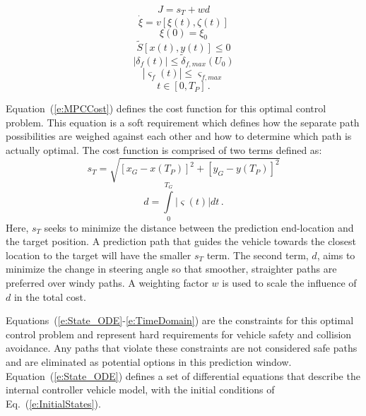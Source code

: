 \documentclass[12pt,twocolumn]{article}
\begin{document}
\begin{equation}\label{e:MPCCost}
J = s_T + wd 
\end{equation}
\begin{equation}\label{e:State_ODE}
\dot{\xi} = v\left[\xi\left(t\right),\zeta\left(t\right)\right] 
\end{equation}
\begin{equation}\label{e:InitialStates}
\xi\left(0\right) = \xi_0 
\end{equation}
\begin{equation}\label{e:SafeArea}
\tilde{S}\left[x\left(t\right),y\left(t\right)\right] \leq0  
\end{equation}
\begin{equation}\label{e:SteerLimit}
\left|\delta_f\left(t\right)\right| \leq\tilde{\delta}_{f,max}\left(U_0\right) 
\end{equation}
\begin{equation}\label{e:SteerRateLimit}
\left|\varsigma_f\left(t\right)\right| \leq\varsigma_{f,max} 
\end{equation}
\begin{equation}\label{e:TimeDomain}
t \in \left[0,T_P\right] \,.
\end{equation}

Equation~(\ref{e:MPCCost}) defines the cost function for this optimal control problem. This equation is a soft requirement which defines how the separate path possibilities are weighed against each other and how to determine which path is actually optimal. The cost function is comprised of two terms defined as:
%
\begin{equation}\label{e:DistanceCost}
s_T = \sqrt{\left[ x_G - x\left(T_P\right)\right]^2 + \left[y_G - y\left(T_P\right)\right]^2 }
\end{equation}
\begin{equation}\label{e:TurningCost}
d = \int \limits_0^{T_G} \left|\varsigma\left(t\right)\right| dt \,.
\end{equation}
%
Here, $s_{T}$ seeks to minimize the distance between the prediction end-location and the target position. A prediction path that guides the vehicle towards the closest location to the target will have the smaller $s_{T}$ term. The second term, $d$, aims to minimize the change in steering angle so that smoother, straighter paths are preferred over windy paths. A weighting factor $w$ is used to scale the influence of $d$ in the total cost.

Equations~(\ref{e:State_ODE}-\ref{e:TimeDomain}) are the constraints for this optimal control problem and represent hard requirements for vehicle safety and collision avoidance. Any paths that violate these constraints are not considered safe paths and are eliminated as potential options in this prediction window. Equation~(\ref{e:State_ODE}) defines a set of differential equations that describe the internal controller vehicle model, with the initial conditions of Eq.~(\ref{e:InitialStates}).
\end{document}
